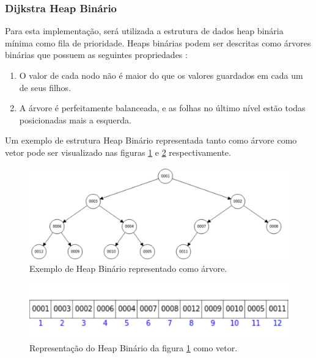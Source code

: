 \subsubsection{Dijkstra Heap Binário}
\label{sec-dijkstra-versoes-heap}
Para esta implementação, será utilizada a estrutura de dados heap binária mínima como fila de prioridade. Heaps binárias podem ser descritas como árvores binárias que possuem as seguintes propriedades \cite{drozdek2012data}:
\begin{enumerate}
 \item O valor de cada nodo não é maior do que os valores guardados em cada um de seus filhos.
 \item A árvore é perfeitamente balanceada, e as folhas no último nível estão todas posicionadas mais a esquerda.
\end{enumerate}

Um exemplo de estrutura Heap Binário representada tanto como árvore como vetor pode ser visualizado nas figuras \ref{fig-dijkstra-heapbinario} e \ref{fig-dijkstra-heapvetor} respectivamente.

\begin{figure}[H]
\centering
\includegraphics[width=.95\textwidth]{figuras/Heap} 
\caption{Exemplo de Heap Binário representado como árvore.}
\label{fig-dijkstra-heapbinario}
\end{figure}

\begin{figure}[H]
\centering
\includegraphics[width=.60\textwidth]{figuras/Heap-vetor}
\caption{Representação do Heap Binário da figura \ref{fig-dijkstra-heapbinario} como vetor.}
\label{fig-dijkstra-heapvetor}
\end{figure}

